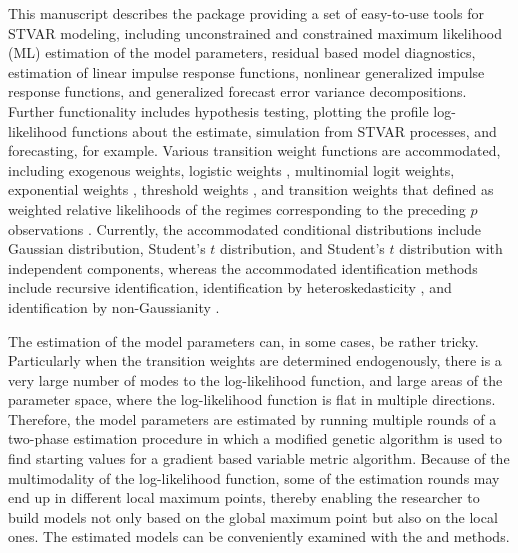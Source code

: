 \documentclass[nojss]{jss}
\begin{document}
This manuscript describes the  package  providing a set of easy-to-use tools for STVAR modeling, including unconstrained and constrained maximum likelihood (ML) estimation of the model parameters, residual based model diagnostics, estimation of linear impulse response functions, nonlinear generalized impulse response functions, and generalized forecast error variance decompositions. Further functionality includes hypothesis testing, plotting the profile log-likelihood functions about the estimate, simulation from STVAR processes, and forecasting, for example. Various transition weight functions are accommodated, including exogenous weights, logistic weights \citep{Anderson+Vahid:1998}, multinomial logit weights, exponential weights \citep[e.g.,][]{Hubrich+Terasvirta:2013}, threshold weights \citep{Tsay:1998}, and transition weights that defined as weighted relative likelihoods of the regimes corresponding to the preceding $p$ observations \citep{Lanne+Virolainen:2024}. Currently, the accommodated conditional distributions include Gaussian distribution, Student's $t$ distribution, and Student's $t$ distribution with independent components, whereas the accommodated identification methods include recursive identification, identification by heteroskedasticity \citep{Lutkepohl+Netsunajev:2017}, and identification by non-Gaussianity \citep{Virolainen2:2024}.

The estimation of the model parameters can, in some cases, be rather tricky. Particularly when the transition weights are determined endogenously, there is a very large number of modes to the log-likelihood function, and large areas of the parameter space, where the log-likelihood function is flat in multiple directions. Therefore, the model parameters are estimated by running multiple rounds of a two-phase estimation procedure in which a modified genetic algorithm is used to find starting values for a gradient based variable metric algorithm. Because of the multimodality of the log-likelihood function, some of the estimation rounds may end up in different local maximum points, thereby enabling the researcher to build models not only based on the global maximum point but also on the local ones. The estimated models can be conveniently examined with the  and  methods.
\end{document}
